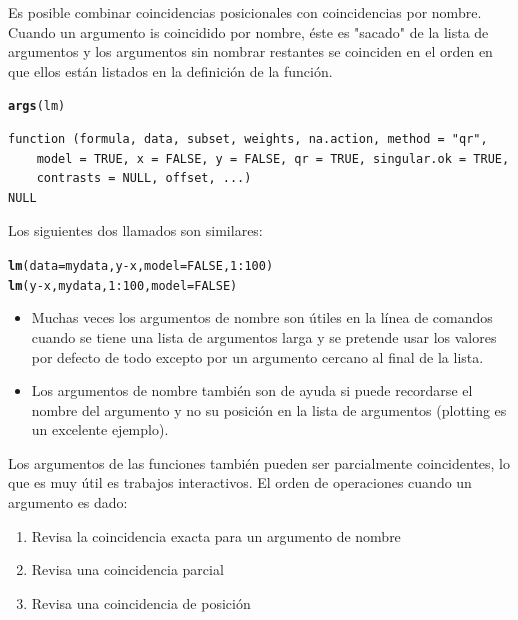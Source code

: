 \documentclass{article}\usepackage[]{graphicx}\usepackage[]{color}
\makeatletter
\newcommand{\hlnum}[1]{\textcolor[rgb]{0.686,0.059,0.569}{#1}}%
\newcommand{\hlopt}[1]{\textcolor[rgb]{0,0,0}{#1}}%
\newcommand{\hlstd}[1]{\textcolor[rgb]{0.345,0.345,0.345}{#1}}%
\newcommand{\hlkwc}[1]{\textcolor[rgb]{0.333,0.667,0.333}{#1}}%
\newcommand{\hlkwd}[1]{\textcolor[rgb]{0.737,0.353,0.396}{\textbf{#1}}}%
\newenvironment{kframe}{%
 \def\at@end@of@kframe{}%
 \ifinner\ifhmode%
  \def\at@end@of@kframe{\end{minipage}}%
  \begin{minipage}{\columnwidth}%
 \fi\fi%
 \def\FrameCommand##1{\hskip\@totalleftmargin \hskip-\fboxsep
 \colorbox{shadecolor}{##1}\hskip-\fboxsep
     \hskip-\linewidth \hskip-\@totalleftmargin \hskip\columnwidth}%
 \MakeFramed {\advance\hsize-\width
   \@totalleftmargin\z@ \linewidth\hsize
   \@setminipage}}%
 {\par\unskip\endMakeFramed%
 \at@end@of@kframe}
\newenvironment{knitrout}{}{} %
\makeatother
\begin{document}
  Es posible combinar coincidencias posicionales con coincidencias por nombre. Cuando un argumento is coincidido por nombre, éste es "sacado" de la lista de argumentos y los argumentos sin nombrar restantes se coinciden en el orden en que ellos están listados en la definición de la función.
\begin{knitrout}
\color{fgcolor}\begin{kframe}
\begin{alltt}
  \hlkwd{args}\hlstd{(lm)}
\end{alltt}
\begin{verbatim}
function (formula, data, subset, weights, na.action, method = "qr", 
    model = TRUE, x = FALSE, y = FALSE, qr = TRUE, singular.ok = TRUE, 
    contrasts = NULL, offset, ...) 
NULL
\end{verbatim}
\end{kframe}
\end{knitrout}

  Los siguientes dos llamados son similares:
\begin{knitrout}
\color{fgcolor}\begin{kframe}
\begin{alltt}
  \hlkwd{lm}\hlstd{(}\hlkwc{data} \hlstd{= mydata, y} \hlopt{-} \hlstd{x,} \hlkwc{model} \hlstd{=} \hlnum{FALSE}\hlstd{,} \hlnum{1}\hlopt{:}\hlnum{100}\hlstd{)}
  \hlkwd{lm}\hlstd{(y} \hlopt{-} \hlstd{x, mydata,} \hlnum{1}\hlopt{:}\hlnum{100}\hlstd{,} \hlkwc{model} \hlstd{=} \hlnum{FALSE}\hlstd{)}
\end{alltt}
\end{kframe}
\end{knitrout}
  
  \begin{itemize}
    \item Muchas veces los argumentos de nombre son útiles  en la línea de comandos cuando se tiene una lista de argumentos larga y se pretende usar los valores por defecto de todo excepto por un argumento cercano al final de la lista.  
    \item Los argumentos de nombre también son de ayuda si puede recordarse el nombre del argumento y no su posición en la lista de argumentos (plotting es un excelente ejemplo).
\end{itemize}

Los argumentos de las funciones también pueden ser parcialmente coincidentes, lo que es muy útil es trabajos interactivos. El orden de operaciones cuando un argumento es dado:
    \begin{enumerate}
      \item Revisa la coincidencia exacta para un argumento de nombre
      \item Revisa una coincidencia parcial
      \item Revisa una coincidencia de posición
    \end{enumerate}
\end{document}
